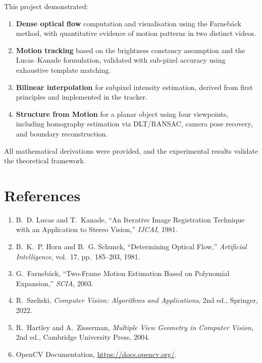 \documentclass[12pt, a4paper]{article}
\begin{document}
This project demonstrated:

\begin{enumerate}
  \item \textbf{Dense optical flow} computation and visualisation using the Farneb\"{a}ck method, with quantitative evidence of motion patterns in two distinct videos.
  \item \textbf{Motion tracking} based on the brightness constancy assumption and the Lucas--Kanade formulation, validated with sub-pixel accuracy using exhaustive template matching.
  \item \textbf{Bilinear interpolation} for subpixel intensity estimation, derived from first principles and implemented in the tracker.
  \item \textbf{Structure from Motion} for a planar object using four viewpoints, including homography estimation via DLT/RANSAC, camera pose recovery, and boundary reconstruction.
\end{enumerate}

All mathematical derivations were provided, and the experimental results validate the theoretical framework.


\section*{References}

\begin{enumerate}
  \item B.~D. Lucas and T.~Kanade, ``An Iterative Image Registration Technique with an Application to Stereo Vision,'' \emph{IJCAI}, 1981.
  \item B.~K.~P. Horn and B.~G. Schunck, ``Determining Optical Flow,'' \emph{Artificial Intelligence}, vol.~17, pp.~185--203, 1981.
  \item G.~Farneb\"{a}ck, ``Two-Frame Motion Estimation Based on Polynomial Expansion,'' \emph{SCIA}, 2003.
  \item R.~Szeliski, \emph{Computer Vision: Algorithms and Applications}, 2nd ed., Springer, 2022.
  \item R.~Hartley and A.~Zisserman, \emph{Multiple View Geometry in Computer Vision}, 2nd ed., Cambridge University Press, 2004.
  \item OpenCV Documentation, \url{https://docs.opencv.org/}.
\end{enumerate}
\end{document}
